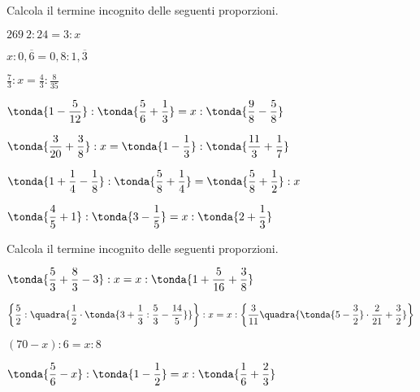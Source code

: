 \begin{esercizio}
 \label{ese:3.120}
Calcola il termine incognito delle seguenti proporzioni.
\begin{enumeratees}
\spazielenx
\item \(269~2:24 =3: x\)
\item \(x:0,\overline{6} =0,8:1,\overline{3}\)
\item \(\displaystyle{\frac{7}{3}:x=\frac{4}{3}:\frac{8}{35}}\)
\item \(\displaystyle{\tonda{1-\frac{5}{12}}:\tonda{\frac{5}{6}+
\frac{1}{3}}=x:\tonda{\frac{9}{8}-\frac{5}{8}}}\)
% 
\item \(\displaystyle{\tonda{\frac{3}{20}+\frac{3}{8}}:x=\tonda{1-
\frac{1}{3}}:%
\tonda{\frac{11}{3}+\frac{1}{7}}}\)
\item \(\displaystyle{\tonda{1+\frac{1}{4}-\frac{1}{8}}:
\tonda{\frac{5}{8}+\frac{1}{4}}=\tonda{\frac{5}{8}%
+\frac{1}{2}}:x}\)
\item \(\displaystyle{\tonda{\frac{4}{5}+1}:\tonda{3-\frac{1}{5}}=x:
\tonda{2+\frac{1}{3}}}\)
\end{enumeratees}
\end{esercizio}

\begin{esercizio}[*]
 \label{ese:3.122}
Calcola il termine incognito delle seguenti proporzioni.
\begin{enumeratees}
\spazielenx
\item \(\displaystyle{\tonda{\frac{5}{3}+\frac{8}{3}-3}:x = x:\tonda{1 + 
\frac{5}{16}+\frac{3}{8}}}\)
\item \(\displaystyle{\bigg\lbrace\frac{5}{2}:\quadra{\frac{1}{2}\cdot
\tonda{3+\frac{1}{3}:\frac{5}{3}-\frac{14}{5}}}\bigg\rbrace%
:x=x:\bigg\lbrace\frac{3}{11}\quadra{\tonda{5-\frac{3}{2}}\cdot
\frac{2}{21}+\frac{3}{2}}\bigg\rbrace}\)
\item \((70-x):6=x:8\)
\item \(\displaystyle{\tonda{\frac{5}{6}-x}:\tonda{1- \frac{1}{2}}=
x: \tonda{\frac{1}{6}+ \frac{2}{3}}}\)
\end{enumeratees}
\end{esercizio}


